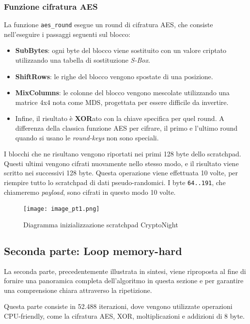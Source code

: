 \subsubsection{Funzione cifratura AES} \label{funzione-cifratura-aes}
La funzione \texttt{aes\_round} esegue un round di cifratura AES, che
consiste nell'eseguire i passaggi seguenti sul blocco:

\begin{itemize}
    \item \textbf{SubBytes}: ogni byte del blocco viene sostituito con un valore criptato
    utilizzando una tabella di sostituzione \emph{S-Box}.
    \item \textbf{ShiftRows}: le righe del blocco vengono spostate di una posizione.
    \item \textbf{MixColumns}: le colonne del blocco vengono mescolate utilizzando una
    matrice 4x4 nota come MDS, progettata per essere difficile
    da invertire.
    \item Infine, il risultato è \textbf{XOR}ato con la chiave specifica per quel round.
    A differenza della classica funzione AES per cifrare, il primo e
    l'ultimo round quando si usano le \emph{round-keys} non sono speciali.
\end{itemize}

I blocchi che ne risultano vengono riportati nei primi 128 byte dello
scratchpad. Questi ultimi vengono cifrati nuovamente nello stesso modo,
e il risultato viene scritto nei successivi 128 byte. Questa operazione
viene effettuata 10 volte, per riempire tutto lo scratchpad di dati
pseudo-randomici. I byte \texttt{64..191}, che chiameremo
\emph{payload}, sono cifrati in questo modo 10 volte. 

\begin{figure}[h!]
  \centering
  \texttt{[image: image\_pt1.png]}
  \caption{Diagramma inizializzazione scratchpad CryptoNight}
\end{figure}

\subsection{Seconda parte: Loop memory-hard}\label{seconda-parte-loop-memory-hard}
La seconda parte, precedentemente illustrata in sintesi, viene riproposta al fine di fornire 
una panoramica completa dell'algoritmo in questa sezione e per garantire una comprensione chiara 
attraverso la ripetizione.

Questa parte consiste in 52.488 iterazioni, dove vengono utilizzate operazioni
CPU-friendly, come la cifratura AES, XOR, moltiplicazioni e addizioni di
8 byte.


